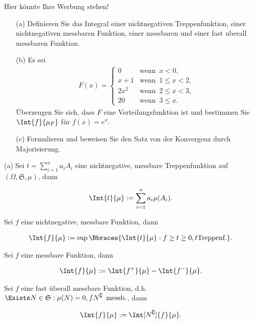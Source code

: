 \begin{exercise}

Hier könnte Ihre Werbung stehen!

\begin{itemize}
  \item[(a)] Definieren Sie das Integral einer nichtnegativen Treppenfunktion, einer nichtnegativen messbaren Funktion, einer messbaren und einer fast uberall messbaren Funktion.
  \item[(b)] Es sei
  \begin{align*}
    F(x) =
    \begin{cases}
      0     & \text{wenn} \enspace  x < 0, \\
      x + 1 & \text{wenn} \enspace 1 \leq x < 2, \\
      2x^2  & \text{wenn} \enspace 2 \leq x < 3, \\
      20    & \text{wenn} \enspace 3 \leq x.
    \end{cases}
  \end{align*}
  Überzeugen Sie sich, dass $F$ eine Verteilungsfunktion ist und bestimmen Sie $\Int{f}{\mu_F}$ für $f(x) = e^x$.
  \item[(c)] Formulieren und beweisen Sie den Satz von der Konvergenz durch Majorisierung.
\end{itemize}

\end{exercise}


\begin{solution}

(a) Sei $t = \sum_{i=1}^n a_i A_i$ eine nichtnegative, messbare Treppenfunktion auf $(\Omega, \mathfrak{S}, \mu)$, dann

\begin{align*}
  \Int{t}{\mu} := \sum_{i=1}^n a_i \mu(A_i).
\end{align*}

Sei $f$ eine nichtnegative, messbare Funktion, dann

\begin{align*}
  \Int{f}{\mu} := \sup \Bbraces{\Int{t}{\mu}: f \geq t \geq 0, t \text{Treppenf.}}.
\end{align*}

Sei $f$ eine messbare Funktion, dann

\begin{align*}
  \Int{f}{\mu} := \Int{f^+}{\mu} - \Int{f^-}{\mu}.
\end{align*}

Sei $f$ eine fast überall messbare Funktion, d.h. $\Exists N \in \mathfrak{S}: \mu(N) = 0, fN^\complement \enspace \text{messb.}$, dann

\begin{align*}
  \Int{f}{\mu} := \Int[N^\complement]{f}{\mu}.
\end{align*}

\end{solution}
